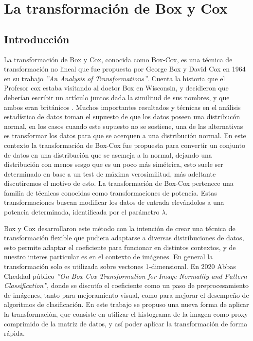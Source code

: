 \chapter{La transformaci\'on de Box y Cox}\label{chap6}

    \section{Introducci\'on}
 
    La transformaci\'on de Box y Cox, conocida como Box-Cox, es una t\'ecnica de transformaci\'on no lineal que fue propuesta por George Box y David Cox en 1964 en su trabajo \textit{''An Analysis of Transformations''}\cite{boxcox64}. Cuenta la historia que el Profesor cox estaba visitando al doctor Box en Wisconsin, y decidieron que deberían escribir un artículo juntos dada la similitud de sus nombres, y que ambos eran británicos \cite{lane2003introduction}. 
    Muchos importantes resultados y t\'ecnicas en el an\'alisis estad\'istico de datos toman el supuesto de que los datos poseen una distribuc\'on normal, en los casos cuando este supuesto no se sostiene, una de las alternativas es transformar los datos para que se acerquen a una distribuci\'on normal. En este contexto la transformaci\'on de Box-Cox fue propuesta para convertir un conjunto de datos en una distribuci\'on que se asemeja a la normal, dejando una distribuci\'on con menos sesgo que es un poco m\'as sim\'etrica, esto suele ser determinado en base a un test de m\'axima verosimilitud, m\'as adeltante discutiremos el motivo de esto. La transformaci\'on de Box-Cox pertenece una familia de t\'ecnicas conocidas como transformaciones de potencia. Estas transformaciones buscan modificar los datos de entrada elev\'andolos a una potencia determinada, identificada por el par\'ametro $\lambda$.
    
    Box y Cox desarrollaron este m\'etodo con la intenci\'on de crear una t\'ecnica de transformaci\'on flexible que pudiera adaptarse a diversas distribuciones de datos, esto permite adaptar el coeficiente para funcionar en distintos contextos, y de nuestro interes particular es en el contexto de im\'agenes. En general la transformaci\'on solo es utilizada sobre vectones 1-dimensional. En 2020 Abbas Cheddad p\'ublico \textit{''On Box-Cox Transformation for Image Normality and Pattern Classification''}\cite{boxcoximg}, donde se discut\'io el coeficiente como un paso de preprocesamiento de im\'agenes, tanto para mejoramiento visual, como para mejorar el desempe\~no de algoritmos de clasificaci\'on. En este trabajo se propuso una nueva forma de aplicar la transformaci\'on, que consiste en utilizar el histograma de la imagen como proxy comprimido de la matriz de datos, y as\'i poder aplicar la transformaci\'on de forma r\'apida.
    
